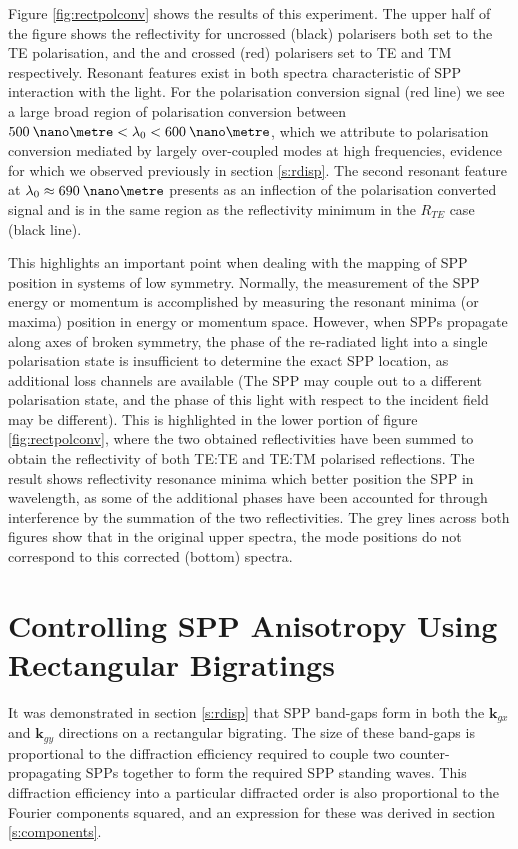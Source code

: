 Figure \ref{fig:rectpolconv} shows the results of this experiment. The upper half of the figure shows the reflectivity for uncrossed (black) polarisers both set to the TE polarisation, and the and crossed (red) polarisers set to TE and TM respectively. Resonant features exist in both spectra characteristic of SPP interaction with the light. For the polarisation conversion signal (red line) we see a large broad region of polarisation conversion between ${500 \:\nano\metre<\lambda_0<600\:\nano\metre}$, which we attribute to polarisation conversion mediated by largely over-coupled modes at high frequencies, evidence for which we observed previously in section \ref{s:rdisp}. The second resonant feature at $\lambda_0 \approx 690\:\nano\metre$ presents as an inflection of the polarisation converted signal and is in the same region as the reflectivity minimum in the $R_{TE}$ case (black line). 

This highlights an important point when dealing with the mapping of SPP position in systems of low symmetry. Normally, the measurement of the SPP energy or momentum is accomplished by measuring the resonant minima (or maxima) position in energy or momentum space. However, when SPPs propagate along axes of broken symmetry, the phase of the re-radiated light into a single polarisation state is insufficient to determine the exact SPP location, as additional loss channels are available (The SPP may couple out to a different polarisation state, and the phase of this light with respect to the incident field may be different). This is highlighted in the lower portion of figure \ref{fig:rectpolconv}, where the two obtained reflectivities have been summed to obtain the reflectivity of both TE:TE and TE:TM polarised reflections. The result shows reflectivity resonance minima which better position the SPP in wavelength, as some of the additional phases have been accounted for  through interference by the summation of the two reflectivities. The grey lines across both figures show that in the original upper  spectra, the mode positions do not correspond to this corrected (bottom) spectra. 


\section{Controlling SPP Anisotropy Using Rectangular Bigratings\label{s:rani}}

It was demonstrated in section \ref{s:rdisp} that SPP band-gaps form in both the $\mathbf{k}_{gx}$ and $\mathbf{k}_{gy}$ directions on a rectangular bigrating. The size of these band-gaps is proportional to the diffraction efficiency required to couple two counter-propagating SPPs together to form the required SPP standing waves. This diffraction efficiency into a particular diffracted order is also proportional to the Fourier components squared, and an expression for these was derived in section \ref{s:components}. 

